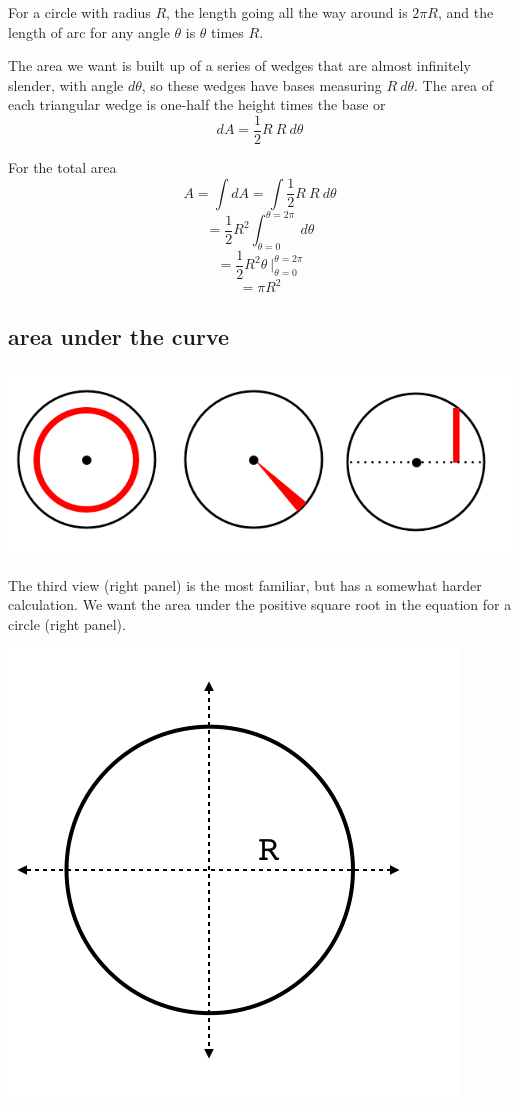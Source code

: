 \documentclass[11pt, oneside]{article}
\begin{document}
For a circle with radius $R$, the length going all the way around is $2 \pi R$, and the length of arc for any angle $\theta$ is $\theta$ times $R$.

The area we want is built up of a series of wedges that are almost infinitely slender, with angle $d \theta$, so these wedges have bases measuring $R \ d \theta$.  The area of each triangular wedge is one-half the height times the base or
\[ dA = \frac{1}{2} R \ R \ d\theta \]

For the total area
\[ A = \int dA = \int  \frac{1}{2} R \ R \ d\theta \]
\[= \frac{1}{2} R^2 \int_{\theta=0}^{\theta=2\pi} \ d\theta \]
\[ = \frac{1}{2} R^2 \theta \  \bigg|_{\theta=0}^{\theta=2\pi} \]
\[ =  \pi R^2 \]

\subsection*{area under the curve}
\begin{center}\includegraphics [scale=0.5] {circles3.png}\end{center}

The third view (right panel) is the most familiar, but has a somewhat harder calculation.  We want the area under the positive square root in the equation for a circle (right panel).
\begin{center}\includegraphics [scale=0.25] {circle.png}\end{center}
\end{document}
